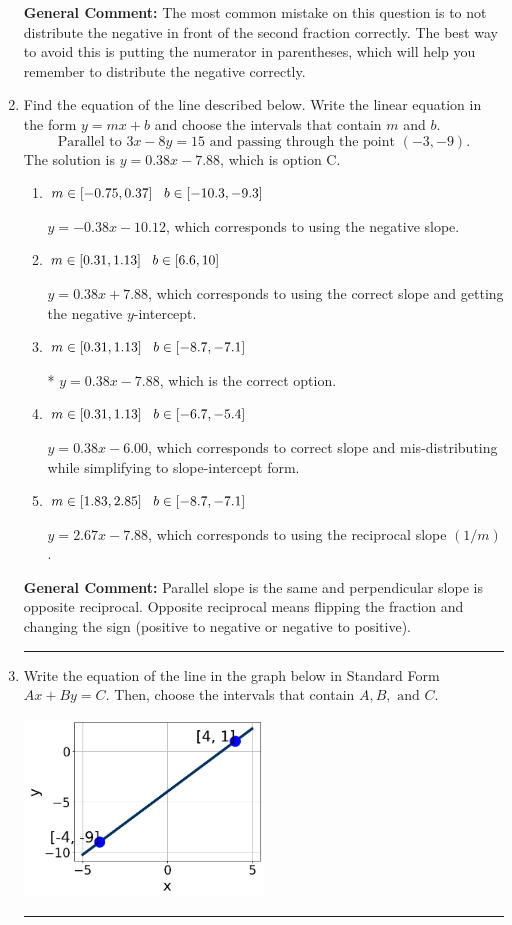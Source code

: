 \documentclass{extbook}[14pt]
\newcommand{\litem}[1]{\item #1

\rule{\textwidth}{0.4pt}}
\begin{document}
\begin{enumerate}
{\textbf{General Comment:} The most common mistake on this question is to not distribute the negative in front of the second fraction correctly. The best way to avoid this is putting the numerator in parentheses, which will help you remember to distribute the negative correctly.
}
\litem{
Find the equation of the line described below. Write the linear equation in the form $ y=mx+b $ and choose the intervals that contain $m$ and $b$.
\[ \text{Parallel to } 3 x - 8 y = 15 \text{ and passing through the point } (-3, -9). \]The solution is \( y = 0.38x - 7.88 \), which is option C.\begin{enumerate}[label=\Alph*.]
\item \( m \in [-0.75, 0.37] \hspace*{3mm} b \in [-10.3, -9.3] \)

 $y = -0.38x - 10.12$, which corresponds to using the negative slope.
\item \( m \in [0.31, 1.13] \hspace*{3mm} b \in [6.6, 10] \)

 $y = 0.38x + 7.88$, which corresponds to using the correct slope and getting the negative $y$-intercept.
\item \( m \in [0.31, 1.13] \hspace*{3mm} b \in [-8.7, -7.1] \)

* $y = 0.38x - 7.88$, which is the correct option.
\item \( m \in [0.31, 1.13] \hspace*{3mm} b \in [-6.7, -5.4] \)

 $y = 0.38x - 6.00$, which corresponds to correct slope and mis-distributing while simplifying to slope-intercept form.
\item \( m \in [1.83, 2.85] \hspace*{3mm} b \in [-8.7, -7.1] \)

 $y = 2.67x - 7.88$, which corresponds to using the reciprocal slope $(1/m)$.
\end{enumerate}

\textbf{General Comment:} Parallel slope is the same and perpendicular slope is opposite reciprocal. Opposite reciprocal means flipping the fraction and changing the sign (positive to negative or negative to positive).
}
\litem{
Write the equation of the line in the graph below in Standard Form $Ax+By=C$. Then, choose the intervals that contain $A, B, \text{ and } C$.

\begin{center}
    \includegraphics[width=0.5\textwidth]{../Figures/linearGraphToStandardCopyA.png}
\end{center}


}
\end{enumerate}
\end{document}
